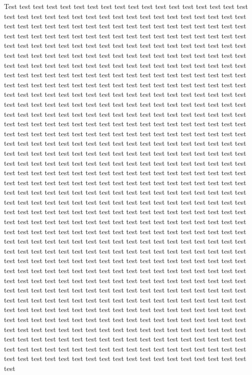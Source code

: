 \documentclass[10pt,journal,compsoc, twoside]{IEEEtran}
\begin{document}
Test test test test test test test test test test test test test test test test test test test test test test test test test test test test test test test test test test test test test test test test test test test test test test test test test test test test test test test test test test test test test test test test test test test test test test test test test test test test test test test test test test test test test test test test test test test test test test test test test test test test test test test test test test test test test test test test test test test test test test test test test test test test test test test test test test test test test test test test test test test test test test test test test test test test test test test test test test test test test test test test test test test test test test test test test test test test test test test test test test test test test test test test test test test test test test test test test test test test test test test test test test test test test test test test test test test test test test test test test test test test test test test test test test test test test test test test test test test test test test test test test test test test test test test test test test test test test test test test test test test test test test test test test test test test test test test test test test test test test test test test test test test test test test test test test test test test test test test test test test test test test test test test test test test test test test test test test test test test test test test test test test test test test test test test test test test test test test test test test test test test test test test test test test test test test test test test test test test test test test test test test test test test test test test test test test test test test test test test test test test test test test test test test test test test test test test test test test test test test test test test test test test test test test test test test test test test test test test test test test test test test test test test test test test test test test test test test test test test test test test test test test test test test test test test test test test test test test test test test test test test test test test test test test test test test test test test test test test test test test test test test test test test test test test test test test test test test test test test test test test test test test test test test test test test test test test test test test test test test test test test test test test test test test test test test test test test test test test test test test test test test test test test test test test test test test test test test test test test test test test test test test test test test test test test test test test test test test test test test test test test test test test test test test test test test test test test test test test test test test test test test test test test test test test test test test test test test test test test test test test test test test test test test test test test test test test test test test test test test test test test test test test test test test test test test test test test test test test test test test test test test test test test test test test 
\end{document}
